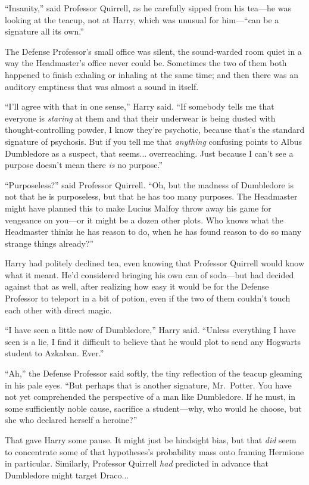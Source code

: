 “Insanity,” said Professor Quirrell, as he carefully sipped from his tea—he was looking at the teacup, not at Harry, which was unusual for him—“can be a signature all its own.”

The Defense Professor’s small office was silent, the sound-warded room quiet in a way the Headmaster’s office never could be. Sometimes the two of them both happened to finish exhaling or inhaling at the same time; and then there was an auditory emptiness that was almost a sound in itself.

“I’ll agree with that in one sense,” Harry said. “If somebody tells me that everyone is \emph{staring} at them and that their underwear is being dusted with thought-controlling powder, I know they’re psychotic, because that’s the standard signature of psychosis. But if you tell me that \emph{anything} confusing points to Albus Dumbledore as a suspect, that seems... overreaching. Just because I can’t see a purpose doesn’t mean there \emph{is} no purpose.”

“Purposeless?” said Professor Quirrell. “Oh, but the madness of Dumbledore is not that he is purposeless, but that he has too many purposes. The Headmaster might have planned this to make Lucius Malfoy throw away his game for vengeance on you—or it might be a dozen other plots. Who knows what the Headmaster thinks he has reason to do, when he has found reason to do so many strange things already?”

Harry had politely declined tea, even knowing that Professor Quirrell would know what it meant. He’d considered bringing his own can of soda—but had decided against that as well, after realizing how easy it would be for the Defense Professor to teleport in a bit of potion, even if the two of them couldn’t touch each other with direct magic.

“I have seen a little now of Dumbledore,” Harry said. “Unless everything I have seen is a lie, I find it difficult to believe that he would plot to send any Hogwarts student to Azkaban. Ever.”

“Ah,” the Defense Professor said softly, the tiny reflection of the teacup gleaming in his pale eyes. “But perhaps that is another signature, Mr.~Potter. You have not yet comprehended the perspective of a man like Dumbledore. If he must, in some sufficiently noble cause, sacrifice a student—why, who would he choose, but she who declared herself a heroine?”

That gave Harry some pause. It might just be hindsight bias, but that \emph{did} seem to concentrate some of that hypotheses’s probability mass onto framing Hermione in particular. Similarly, Professor Quirrell \emph{had} predicted in advance that Dumbledore might target Draco...

